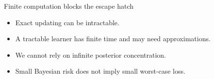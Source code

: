 \documentclass[11pt,aspectratio=169]{beamer}
\begin{document}
\begin{frame}{Finite computation blocks the escape hatch}
\Large
\begin{itemize}[<+->]
    \item Exact updating can be intractable.
    \item A tractable learner has finite time and may need approximations.
    \item We cannot rely on infinite posterior concentration.
    \item Small Bayesian risk does not imply small worst-case loss.
\end{itemize}
\end{frame}
\end{document}
